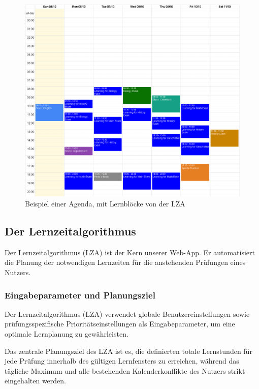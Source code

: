 \documentclass[12pt,a4paper]{report}
\begin{document}
\begin{figure}
    \centering
    \includegraphics[width=\linewidth]{img/agenda.png}
    \caption{Beispiel einer Agenda, mit Lernblöcke von der LZA}
    \label{fig:placeholder}
\end{figure}
\subsection{Der Lernzeitalgorithmus}
Der Lernzeitalgorithmus (LZA) ist der Kern unserer Web-App. Er automatisiert die Planung der notwendigen Lernzeiten für die anstehenden Prüfungen eines Nutzers.

\subsubsection{Eingabeparameter und Planungsziel}

Der Lernzeitalgorithmus (LZA) verwendet globale Benutzereinstellungen sowie prüfungsspezifische Prioritätseinstellungen als Eingabeparameter, um eine optimale Lernplanung zu gewährleisten.

Das zentrale Planungsziel des LZA ist es, die definierten totale Lernstunden für jede Prüfung innerhalb des gültigen Lernfensters zu erreichen, während das tägliche Maximum und alle bestehenden Kalenderkonflikte des Nutzers strikt eingehalten werden.
\end{document}
